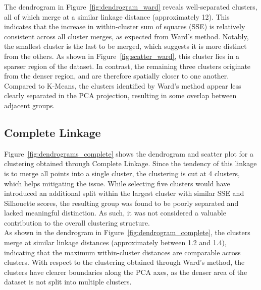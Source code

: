 The dendrogram in Figure~\ref{fig:dendrogram_ward} reveals well-separated clusters, all of which merge at a
similar linkage distance (approximately 12). This indicates that the increase in within-cluster sum of
squares (SSE) is relatively consistent across all cluster merges, as expected from Ward's method.
Notably, the smallest cluster is the last to be merged, which suggests it is more distinct from the others.
As shown in Figure~\ref{fig:scatter_ward}, this cluster lies in a sparser region of the dataset.
In contrast, the remaining three clusters originate from the denser region, and are therefore spatially
closer to one another.
Compared to K-Means, the clusters identified by Ward's method appear less clearly separated in the PCA
projection, resulting in some overlap between adjacent groups.





\subsection{Complete Linkage}
Figure~\ref{fig:dendrograms_complete} shows the dendrogram and scatter plot for a clustering obtained
through Complete Linkage.
Since the tendency of this linkage is to merge all points into a single cluster, the clustering is cut at 4 clusters,
which helps mitigating the issue. While selecting five clusters would have introduced an additional split
within the largest cluster with similar SSE and Silhouette scores, the resulting group was found to be
poorly separated and lacked meaningful distinction.
As such, it was not considered a valuable contribution to the overall clustering structure.\\

As shown in the dendrogram in Figure~\ref{fig:dendrogram_complete}, the clusters merge at similar linkage
distances (approximately between 1.2 and 1.4), indicating that the maximum within-cluster distances are
comparable across clusters. With respect to the clustering obtained through Ward's method, the clusters
have clearer boundaries along the PCA axes, as the denser area of the dataset is not split into multiple
clusters.\\

